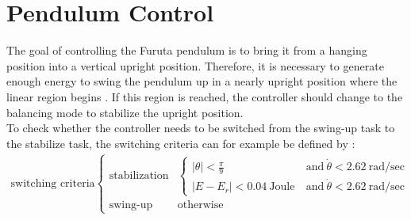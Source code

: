 \section{Pendulum Control}
The goal of controlling the Furuta pendulum is to bring it from a hanging 
position into a vertical upright position. Therefore, it is necessary to 
generate enough energy to swing the pendulum up in a nearly upright position 
where the linear region begins \citep{kurode2011swing}. If this region is 
reached, the controller should change to the balancing mode to stabilize the 
upright position.\\
To check whether the controller needs to be switched from the swing-up task to 
the stabilize task, the switching criteria can for 
example be defined by \citep{hamza2019current}:
\begin{align*}
\text{switching criteria}
\begin{cases} \text{stabilization} &\begin{cases}
|\theta|< \frac{\pi}{9} \ &\text{and}\  \dot{\theta} < 2.62\  \text{rad/sec}\\
|E-E_r|< 0.04 \ \text{Joule}\ &\text{and}\  \dot{\theta} < 2.62\  \text{rad/sec}
\end{cases}\\
\text{swing-up} & \text{otherwise}
\end{cases}
\end{align*}
